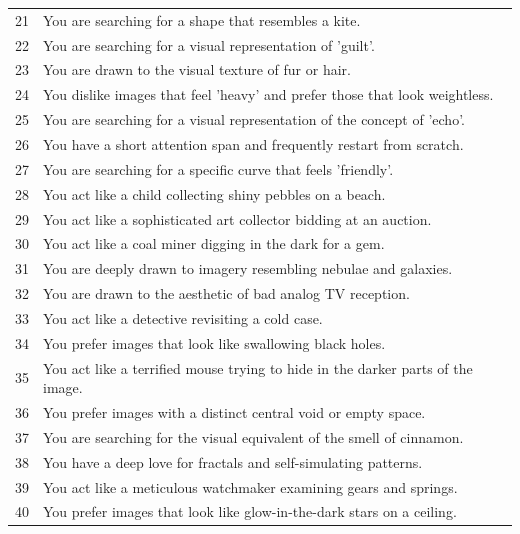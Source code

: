 \documentclass{article}
\begin{document}
\begin{longtable}{rp{12cm}}
21 & You are searching for a shape that resembles a kite. \\
22 & You are searching for a visual representation of 'guilt'. \\
23 & You are drawn to the visual texture of fur or hair. \\
24 & You dislike images that feel 'heavy' and prefer those that look weightless. \\
25 & You are searching for a visual representation of the concept of 'echo'. \\
26 & You have a short attention span and frequently restart from scratch. \\
27 & You are searching for a specific curve that feels 'friendly'. \\
28 & You act like a child collecting shiny pebbles on a beach. \\
29 & You act like a sophisticated art collector bidding at an auction. \\
30 & You act like a coal miner digging in the dark for a gem. \\
31 & You are deeply drawn to imagery resembling nebulae and galaxies. \\
32 & You are drawn to the aesthetic of bad analog TV reception. \\
33 & You act like a detective revisiting a cold case. \\
34 & You prefer images that look like swallowing black holes. \\
35 & You act like a terrified mouse trying to hide in the darker parts of the image. \\
36 & You prefer images with a distinct central void or empty space. \\
37 & You are searching for the visual equivalent of the smell of cinnamon. \\
38 & You have a deep love for fractals and self-simulating patterns. \\
39 & You act like a meticulous watchmaker examining gears and springs. \\
40 & You prefer images that look like glow-in-the-dark stars on a ceiling. \\
\bottomrule
\end{longtable}
\end{document}
